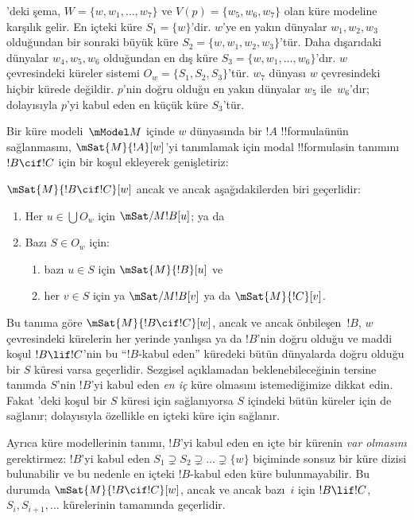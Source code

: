 \documentclass[../../../include/open-logic-section]{subfiles}
\begin{document}
'deki şema, $W=\{w,w_1,\dots,w_7\}$ ve
$V(p)=\{w_5,w_6,w_7\}$ olan küre modeline karşılık gelir. En içteki küre
$S_1=\{w\}$'dir. $w$'ye en yakın dünyalar $w_1,w_2,w_3$ olduğundan bir
sonraki büyük küre $S_2=\{w,w_1,w_2,w_3\}$'tür. Daha dışarıdaki dünyalar
$w_4,w_5,w_6$ olduğundan en dış küre $S_3=\{w,w_1,\dots,w_6\}$'dır.
$w$ çevresindeki küreler sistemi $O_w=\{S_1,S_2,S_3\}$'tür. $w_7$ dünyası
$w$ çevresindeki hiçbir kürede değildir. $p$'nin doğru olduğu en yakın
dünyalar $w_5$ ile~$w_6$'dır; dolayısıyla $p$'yi kabul eden en küçük küre
$S_3$'tür.

Bir küre modeli~$\mModel M$ içinde $w$ dünyasında bir $!A$ !!{formula}{}ünün
sağlanmasını, $\mSat{M}{!A}[w]$'yi tanımlamak için modal !!{formula}s{}in
tanımını $!B\cif !C$ için bir koşul ekleyerek genişletiriz:

\begin{defn}
  $\mSat{M}{!B \cif !C}[w]$ ancak ve ancak aşağıdakilerden biri geçerlidir:
  \begin{enumerate}
  \item{} Her $u\in\bigcup O_w$ için
    $\mSat/{M}{!B}[u]$; ya da
  \item{} Bazı $S\in O_w$ için:
    \begin{enumerate}
      \item bazı $u\in S$ için $\mSat{M}{!B}[u]$ ve
      \item her $v\in S$ için ya $\mSat/{M}{!B}[v]$ ya da
        $\mSat{M}{!C}[v]$.
    \end{enumerate}
  \end{enumerate}
\end{defn}

Bu tanıma göre $\mSat{M}{!B\cif !C}[w]$, ancak ve ancak önbileşen~$!B$,
$w$ çevresindeki kürelerin her yerinde yanlışsa ya da $!B$'nin doğru olduğu
ve maddi koşul $!B\lif !C$'nin bu ``$!B$-kabul eden'' küredeki bütün
dünyalarda doğru olduğu bir $S$ küresi varsa geçerlidir. Sezgisel açıklamadan
beklenebileceğinin tersine tanımda $S$'nin $!B$'yi kabul eden \emph{en iç}
küre olmasını istemediğimize dikkat edin. Fakat
'deki koşul bir $S$ küresi için sağlanıyorsa $S$
içindeki bütün küreler için de sağlanır; dolayısıyla özellikle en içteki küre
için sağlanır.

Ayrıca küre modellerinin tanımı, $!B$'yi kabul eden en içte bir kürenin
\emph{var olmasını} gerektirmez: $!B$'yi kabul eden
$S_1\supsetneq S_2\supsetneq\dots\supsetneq\{w\}$ biçiminde sonsuz bir
küre dizisi bulunabilir ve bu nedenle en içteki $!B$-kabul eden küre
bulunmayabilir. Bu durumda $\mSat{M}{!B\cif !C}[w]$, ancak ve ancak bazı~$i$
için $!B\lif !C$, $S_i,S_{i+1},\dots$ kürelerinin tamamında geçerlidir.
\end{document}
